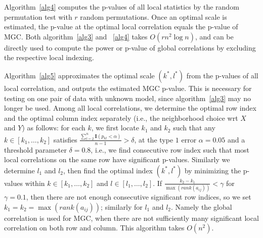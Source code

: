 \documentclass[11pt]{article}
\providecommand{\mb}[1]{\boldsymbol{#1}}
\begin{document}
Algorithm~\ref{alg4} computes the p-values of all local statistics by the random permutation test with $r$ random permutations. Once an optimal scale is estimated, the p-value at the optimal local correlation equals the p-value of MGC. Both algorithm~\ref{alg3} and ~\ref{alg4} takes $O(rn^2 \log n)$, and can be directly used to compute the power or p-value of global correlations by excluding the respective local indexing.

Algorithm~\ref{alg5} approximates the optimal scale $(k^{*},l^{*})$ from the p-values of all local correlation, and outputs the estimated MGC p-value. This is necessary for testing on one pair of data with unknown model, since algorithm~\ref{alg3} may no longer be used. Among all local correlations, we determine the optimal row index and the optimal column index separately (i.e., the neighborhood choice wrt $X$ and $Y$) as follows: for each $k$, we first locate $k_{1}$ and $k_{2}$ such that any $k \in [k_{1},\ldots, k_{2}]$ satisfies $\frac{\sum_{l=2}^{n} \mb{I}(p_{kl}<\alpha)}{n-1}>\delta$, at the type $1$ error $\alpha=0.05$ and a threshold parameter $\delta=0.8$, i.e., we find consecutive row index such that most local correlations on the same row have significant p-values. Similarly we determine $l_{1}$ and $l_{2}$, then find the optimal index $(k^{*},l^{*})$ by minimizing the p-values within $k \in [k_{1},\ldots, k_{2}]$ and $l \in [l_{1},\ldots, l_{2}]$. If $\frac{k_{2}-k_{1}}{\max(rank(a_{ij}))} < \gamma$ for $\gamma=0.1$, then there are not enough consecutive significant row indices, so we set $k_{1}=k_{2}=\max(rank(a_{ij}))$; similarly for $l_{1}$ and $l_{2}$. Namely the global correlation is used for MGC, when there are not sufficiently many significant local correlation on both row and column. This algorithm takes $O(n^2)$.

%
%
%
%
%
%
\end{document}
